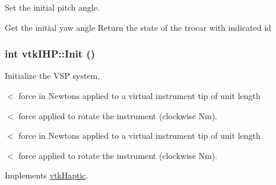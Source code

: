 Set the initial pitch angle. 

Get the initial yaw angle Return the state of the trocar with indicated id \hypertarget{classvtkIHP_a055cc6c8150236aa3899647e32c3a0da}{
\subsubsection[{Init}]{\setlength{\rightskip}{0pt plus 5cm}int vtkIHP::Init ()}}
\label{classvtkIHP_a055cc6c8150236aa3899647e32c3a0da}


Initialize the VSP system. 



$<$ force in Newtons applied to a virtual instrument tip of unit length

$<$ force applied to rotate the instrument (clockwise Nm).

$<$ force in Newtons applied to a virtual instrument tip of unit length

$<$ force applied to rotate the instrument (clockwise Nm). 



Implements \hyperlink{classvtkHaptic_a164a353869ace1e3b359da03ce873066}{vtkHaptic}.

